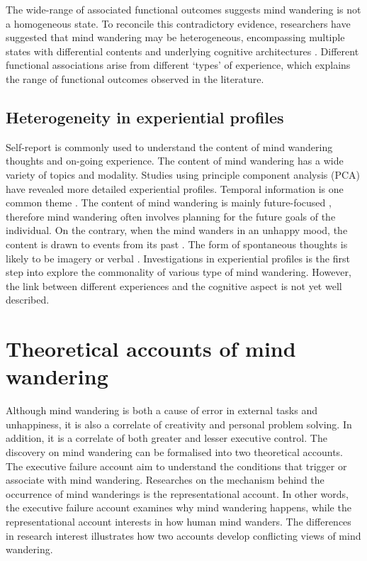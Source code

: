 The wide-range of associated functional outcomes suggests mind wandering is not a homogeneous state. To reconcile this contradictory evidence, researchers have suggested that mind wandering may be heterogeneous, encompassing multiple states with differential contents and underlying cognitive architectures \cite{SmallwoodFrontiers2013}. Different functional associations arise from different `types' of experience, which explains the range of functional outcomes observed in the literature.


\subsection{Heterogeneity in experiential profiles}
Self-report is commonly used to understand the content of mind wandering thoughts and on-going experience. The content of mind wandering has a wide variety of topics and modality. Studies using principle component analysis (PCA) have revealed more detailed experiential profiles. Temporal information is one common theme \cite{RubyFP2013,RubyPlos2013}. The content of mind wandering is mainly future-focused \cite{Baird2011}, therefore mind wandering often involves planning for the future goals of the individual. On the contrary, when the mind wanders in an unhappy mood, the content is drawn to events from its past \cite{Smallwood2011}. The form of spontaneous thoughts is likely to be imagery or verbal \cite{Gorgolewski2014,Smallwood2016}. Investigations in experiential profiles is the first step into explore the commonality of various type of mind wandering. However, the link between different experiences and the cognitive aspect is not yet well described.  



\section{Theoretical accounts of mind wandering}

Although mind wandering is both a cause of error in external tasks and unhappiness, it is also a correlate of creativity and personal problem solving. In addition, it is a correlate of both greater and lesser executive control. The discovery on mind wandering can be formalised into two theoretical accounts. The executive failure account aim to understand the conditions that trigger or associate with mind wandering. Researches on the mechanism behind the occurrence of mind wanderings is the representational account. In other words, the executive failure account examines why mind wandering happens, while the representational account interests in how human mind wanders. The differences in research interest illustrates how two accounts develop conflicting views of mind wandering. 

